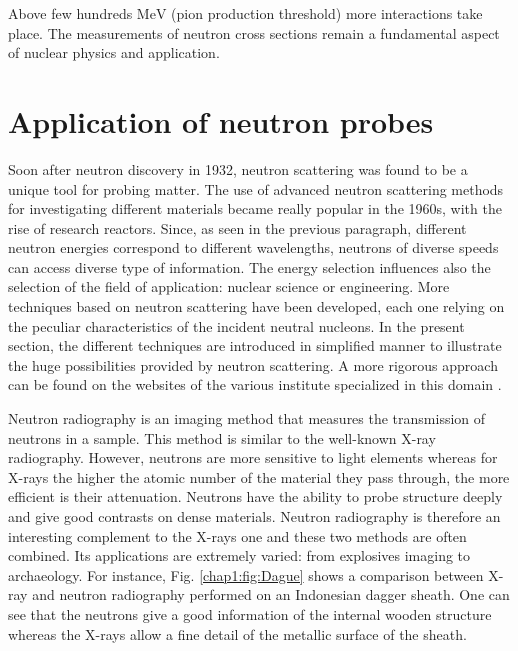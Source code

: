\begin{refsection}
  Above few hundreds $\mathrm{MeV}$ (pion production threshold) more interactions take place. The measurements of neutron cross sections remain a fundamental aspect of nuclear physics and application.


  \section{Application of neutron probes}
  Soon after neutron discovery in 1932, neutron scattering was found to be a unique tool for probing matter.  The use of advanced neutron scattering methods for investigating different materials became really popular in the 1960s, with the rise of research reactors. Since, as seen in the previous paragraph, different neutron energies correspond to different wavelengths, neutrons of diverse speeds can access diverse type of information. The energy selection influences also the selection of the field of application:  nuclear science or engineering. More techniques based on neutron scattering have been developed, each one relying on the peculiar characteristics of the incident neutral nucleons. In the present section, the different techniques are introduced in simplified manner to illustrate the huge possibilities provided by neutron scattering. A more rigorous approach can be found on the websites of the various institute specialized in this domain \cite{LLBinfo,ILLinfo,ISISinfo}.

  Neutron radiography is an imaging method that measures the transmission of neutrons in a sample. This method is similar to the well-known X-ray radiography. However, neutrons are more sensitive to light elements whereas for X-rays the higher the atomic number of the material they pass through, the more efficient is their attenuation. Neutrons have the ability to probe structure deeply and give good contrasts on dense materials. Neutron radiography is therefore an interesting complement to the X-rays one and these two methods are often combined. Its applications are extremely varied: from explosives imaging to archaeology. For instance, Fig. \ref{chap1:fig:Dague} shows a comparison between  X-ray and neutron radiography performed on an Indonesian dagger sheath. One can see that the neutrons give a good information of the internal wooden structure whereas the X-rays allow a fine detail of the metallic surface of the sheath.


\end{refsection}
